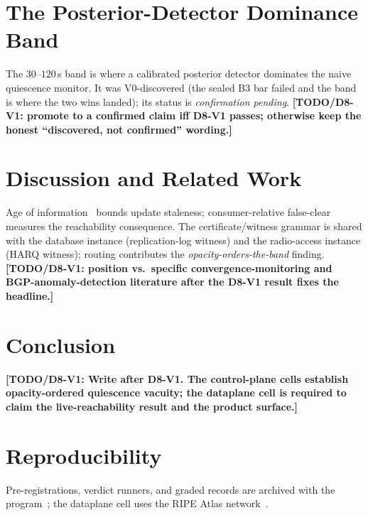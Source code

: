 \documentclass[lettersize,onecolumn]{IEEEtran}
\newcommand{\TODO}[1]{{\color{red}\textbf{[TODO/D8-V1: #1]}}}
\begin{document}
\section{The Posterior-Detector Dominance Band}
The $30$--$120$\,s band is where a calibrated posterior detector dominates the
naive quiescence monitor. It was V0-discovered (the sealed B3 bar failed and the
band is where the two wins landed); its status is \emph{confirmation pending}.
\TODO{promote to a confirmed claim iff D8-V1 passes; otherwise keep the honest
``discovered, not confirmed'' wording.}

\section{Discussion and Related Work}
Age of information~\cite{kaul2012aoi} bounds update staleness; consumer-relative
false-clear measures the reachability consequence. The certificate/witness
grammar is shared with the database instance (replication-log witness) and the
radio-access instance (HARQ witness); routing contributes the
\emph{opacity-orders-the-band} finding. \TODO{position vs.\ specific
convergence-monitoring and BGP-anomaly-detection literature after the D8-V1
result fixes the headline.}

\section{Conclusion}
\TODO{Write after D8-V1. The control-plane cells establish opacity-ordered
quiescence vacuity; the dataplane cell is required to claim the live-reachability
result and the product surface.}

\section*{Reproducibility}
Pre-registrations, verdict runners, and graded records are archived with the
program~\cite{bond_prereg}; the dataplane cell uses the RIPE Atlas
network~\cite{ripeatlas}.



\end{document}
